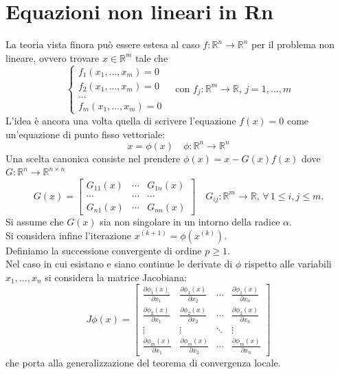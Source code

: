 \documentclass[12pt,a4paper,]{report}
\begin{document}
\section{Equazioni non lineari in Rn}
La teoria vista finora può essere estesa al caso $f:\mathbb{R}^n\to\mathbb{R}^n$ per il problema non lineare, ovvero trovare $x\in\mathbb{R}^m$ tale che
\[
\begin{cases}
f_1(x_1, \ldots, x_m) = 0 \\
f_2(x_1, \ldots, x_m) = 0 \\
\ldots \\
f_m(x_1, \ldots, x_m) = 0
\end{cases}
\quad \text{con } f_j : \mathbb{R}^m \to \mathbb{R}, \, j = 1,...,m
\]
L'idea è ancora una volta quella di scrivere l'equazione $f(x)=0$ come un'equazione di punto fisso vettoriale:
\[
x=\phi(x) \quad \phi:\mathbb{R}^n\to\mathbb{R}^n
\]
Una scelta canonica consiste nel prendere $\phi(x) = x - G(x)f(x)$ dove $G : \mathbb{R}^n \to \mathbb{R}^{n \times n}$ 
\[
G(x) = \begin{bmatrix}
G_{11}(x) & \cdots & G_{1n}(x) \\
\cdots & \cdots & \cdots \\
G_{n1}(x) & \cdots & G_{nn}(x)
\end{bmatrix}
\quad G_{ij} : \mathbb{R}^m \to \mathbb{R}, \, \forall \, 1 \leq i, j \leq m.
\]
Si assume che $G(x)$ sia non singolare in un intorno della radice $\alpha$.\\
Si considera infine l'iterazione $x^{(k+1)} = \phi(x^{(k)})$.\\
Definiamo la successione convergente di ordine $p\ge 1$.\\
Nel caso in cui esistano e siano continue le derivate di $\phi$ rispetto alle variabili $x_1,...,x_n$ si considera la matrice Jacobiana:
\[
J\phi(x) = 
\begin{bmatrix}
\frac{\partial \phi_1(x)}{\partial x_1} & \frac{\partial \phi_1(x)}{\partial x_2} & \cdots & \frac{\partial \phi_1(x)}{\partial x_n} \\
\frac{\partial \phi_2(x)}{\partial x_1} & \frac{\partial \phi_2(x)}{\partial x_2} & \cdots & \frac{\partial \phi_2(x)}{\partial x_n} \\
\vdots & \vdots & \ddots & \vdots \\
\frac{\partial \phi_m(x)}{\partial x_1} & \frac{\partial \phi_m(x)}{\partial x_2} & \cdots & \frac{\partial \phi_m(x)}{\partial x_n}
\end{bmatrix}
\]
che porta alla generalizzazione del teorema di convergenza locale.
\end{document}

